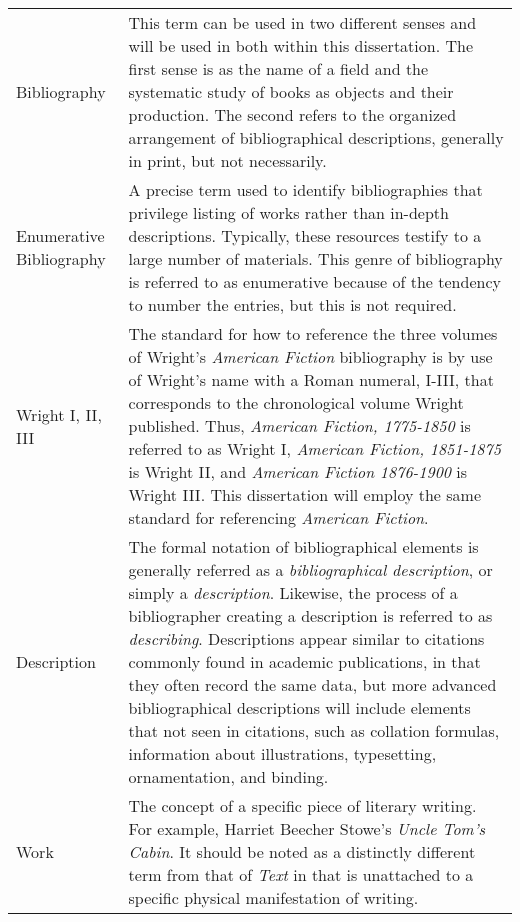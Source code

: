 \hspace*{-1.25in}
\vspace{12pt}
\begin{spacing}{1.0}
	\begin{longtable}[htbp]{@{}p{} p{}@{}}
		Bibliography	&	This term can be used in two different senses and will be used in both within this dissertation. The first sense is as the name of a field and the systematic study of books as objects and their production. The second refers to the organized arrangement of bibliographical descriptions, generally in print, but not necessarily.\\	[2ex]
		Enumerative Bibliography		&	A precise term used to identify bibliographies that privilege listing of works rather than in-depth descriptions. Typically, these resources testify to a large number of materials. This genre of bibliography is referred to as enumerative because of the tendency to number the entries, but this is not required.\\	[2ex] %
		Wright I, II, III			&	The standard for how to reference the three volumes of Wright's \textit{American Fiction} bibliography is by use of Wright's name with a Roman numeral, I-III, that corresponds to the chronological volume Wright published. Thus, \textit{American Fiction, 1775-1850} is referred to as Wright I, \textit{American Fiction, 1851-1875} is Wright II, and \textit{American Fiction 1876-1900} is Wright III. This dissertation will employ the same standard for referencing \textit{American Fiction}.\\	[2ex]
		Description & The formal notation of bibliographical elements is generally referred as a \textit{bibliographical description}, or simply a \textit{description}. Likewise, the process of a bibliographer creating a description is referred to as \textit{describing}. Descriptions appear similar to citations commonly found in academic publications, in that they often record the same data, but more advanced bibliographical descriptions will include elements that not seen in citations, such as collation formulas, information about illustrations, typesetting, ornamentation, and binding.\\ [2ex]
		Work & The concept of a specific piece of literary writing. For example, Harriet Beecher Stowe's \textit{Uncle Tom's Cabin}. It should be noted as a distinctly different term from that of \textit{Text} in that is unattached to a specific physical manifestation of writing.\\ [2ex]

\end{longtable}
\end{spacing}
